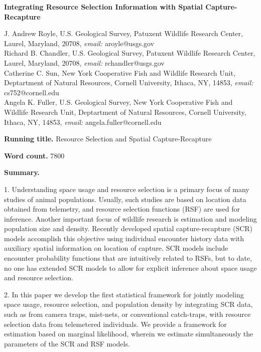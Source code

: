 \documentclass[12pt]{article}
\begin{document}
\begin{center}
\Large \textbf{
Integrating
Resource Selection Information with Spatial Capture-Recapture
}
\end{center}
%


\noindent J. Andrew Royle, U.S. Geological Survey, Patuxent
Wildlife Research Center, Laurel, Maryland, 20708,
\emph{email:} aroyle@usgs.gov \\

\noindent Richard B. Chandler,  U.S. Geological Survey, Patuxent
Wildlife Research Center, Laurel, Maryland, 20708,
\emph{email:} rchandler@usgs.gov \\

\noindent Catherine C.  Sun, New York Cooperative Fish and Wildlife
Research Unit, Deptartment of Natural Resources, Cornell
University, Ithaca, NY, 14853,
\emph{email:} cs752@cornell.edu \\

\noindent Angela K. Fuller, U.S. Geological Survey, New York Cooperative Fish and Wildlife
Research Unit, Deptartment of Natural Resources, Cornell
University, Ithaca, NY, 14853,
\emph{email:} angela.fuller@cornell.edu \\

\vspace{.2in}

{\bf Running title.} Resource Selection and Spatial Capture-Recapture

\vspace{.2in}

{\bf Word count.} 7800  

\vspace{.2in}

{\bf Summary.}

1.  Understanding space usage and resource selection is a primary
focus of many studies of animal populations. Usually, such studies are
based on location data obtained from telemetry, and resource selection
functions (RSF) are used for inference.  Another important focus of
wildlife research is estimation and modeling population size and
density.  Recently developed spatial capture-recapture (SCR) models
accomplish this objective using individual encounter history data with
auxiliary spatial information on location of capture. SCR models
include encounter probability functions that are intuitively related
to RSFs, but to date, no one has extended SCR models to allow for
explicit inference about space usage and resource selection.

2. In this paper we develop the first statistical framework for
jointly modeling space usage, resource selection, and population
density by integrating SCR data, such as from camera traps, mist-nets,
or conventional catch-traps, with resource selection data from
telemetered individuals.  We provide a framework for estimation based
on marginal likelihood, wherein we estimate simultaneously the
parameters of the SCR and RSF models.
\end{document}

